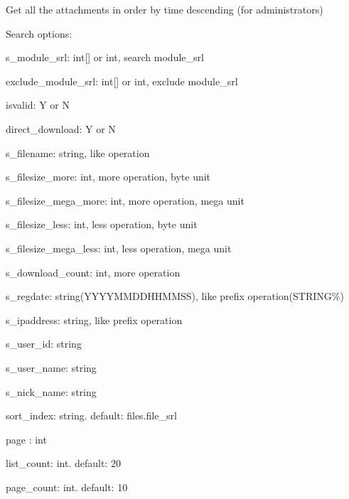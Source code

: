 Get all the attachments in order by time descending (for administrators)


\begin{DoxyPre}
Search options:
\begin{DoxyItemize}
\item s\_module\_srl:          int[] or int, search module\_srl
\item exclude\_module\_srl:    int[] or int, exclude module\_srl
\item isvalid:               Y or N
\item direct\_download:       Y or N
\item s\_filename:            string, like operation
\item s\_filesize\_more:       int, more operation, byte unit
\item s\_filesize\_mega\_more:  int, more operation, mega unit
\item s\_filesize\_less:       int, less operation, byte unit
\item s\_filesize\_mega\_less:  int, less operation, mega unit
\item s\_download\_count:      int, more operation
\item s\_regdate:             string(YYYYMMDDHHMMSS), like prefix operation(STRING\%)
\item s\_ipaddress:           string, like prefix operation
\item s\_user\_id:             string
\item s\_user\_name:           string
\item s\_nick\_name:           string
\item sort\_index:            string. default: files.file\_srl
\item page :                 int
\item list\_count:            int. default: 20
\item page\_count:            int. default: 10
\end{DoxyItemize}\end{DoxyPre}



